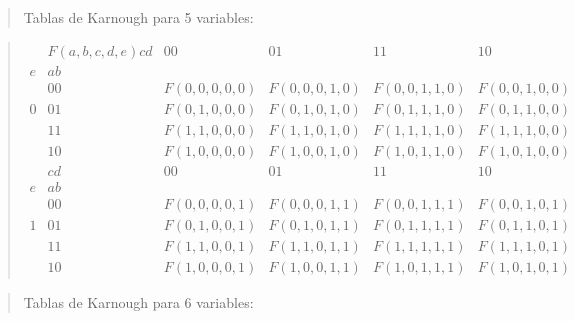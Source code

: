 \documentclass[
]{article}
\begin{document}
\begin{quote}
Tablas de Karnough para 5 variables:
\end{quote}

\begin{quote}
\[\begin{matrix}
 & {F{({a,b,c,d,e})}\mathit{cd}} & 00 & 01 & 11 & 10 \\
e & \mathit{ab} & & & & \\
 & 00 & {F{({0,0,0,0,0})}} & {F{({0,0,0,1,0})}} & {F{({0,0,1,1,0})}} & {F{({0,0,1,0,0})}} \\
0 & 01 & {F{({0,1,0,0,0})}} & {F{({0,1,0,1,0})}} & {F{({0,1,1,1,0})}} & {F{({0,1,1,0,0})}} \\
 & 11 & {F{({1,1,0,0,0})}} & {F{({1,1,0,1,0})}} & {F{({1,1,1,1,0})}} & {F{({1,1,1,0,0})}} \\
 & 10 & {F{({1,0,0,0,0})}} & {F{({1,0,0,1,0})}} & {F{({1,0,1,1,0})}} & {F{({1,0,1,0,0})}} \\
 & {\mathit{cd}} & 00 & 01 & 11 & 10 \\
e & \mathit{ab} & & & & \\
 & 00 & {F{({0,0,0,0,1})}} & {F{({0,0,0,1,1})}} & {F{({0,0,1,1,1})}} & {F{({0,0,1,0,1})}} \\
1 & 01 & {F{({0,1,0,0,1})}} & {F{({0,1,0,1,1})}} & {F{({0,1,1,1,1})}} & {F{({0,1,1,0,1})}} \\
 & 11 & {F{({1,1,0,0,1})}} & {F{({1,1,0,1,1})}} & {F{({1,1,1,1,1})}} & {F{({1,1,1,0,1})}} \\
 & 10 & {F{({1,0,0,0,1})}} & {F{({1,0,0,1,1})}} & {F{({1,0,1,1,1})}} & {F{({1,0,1,0,1})}}
\end{matrix}\]
\end{quote}

\begin{quote}
Tablas de Karnough para 6 variables:
\end{quote}
\end{document}

